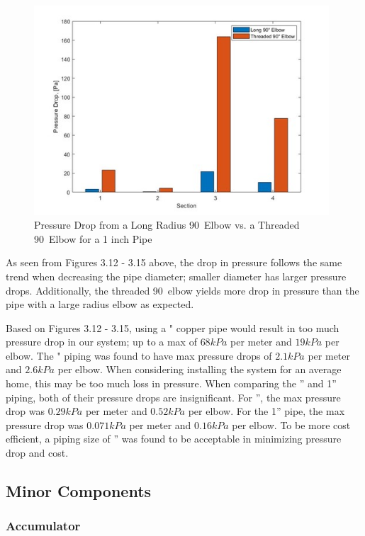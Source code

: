 \begin{figure}[H]
    \centering
    \includegraphics[width=11cm]{images/pressure_drops_elbows4.jpg}
    \caption{Pressure Drop from a Long Radius 90\textdegree \ Elbow vs. a Threaded 90\textdegree \ Elbow for a 1 inch Pipe}
\end{figure}

\medskip
As seen from Figures 3.12 - 3.15 above, the drop in pressure follows the same trend when decreasing the pipe diameter; smaller diameter has larger pressure drops. Additionally, the threaded 90\textdegree \ elbow yields more drop in pressure than the pipe with a large radius elbow as expected.

\medskip
Based on Figures 3.12 - 3.15, using a " copper pipe would result in too much pressure drop in our system; up to a max of $68kPa$ per meter and $19kPa$ per elbow. The " piping was found to have max pressure drops of $2.1kPa$ per meter and $2.6kPa$ per elbow. When considering installing the system for an average home, this may be too much loss in pressure. When comparing the ” and 1” piping, both of their pressure drops are insignificant. For ”, the max pressure drop was $0.29kPa$ per meter and $0.52kPa$ per elbow. For the 1” pipe, the max pressure drop was $0.071kPa$ per meter and $0.16kPa$ per elbow. To be more cost efficient, a piping size of ” was found to be acceptable in minimizing pressure drop and cost.

\subsection{Minor Components}

\subsubsection{Accumulator}

